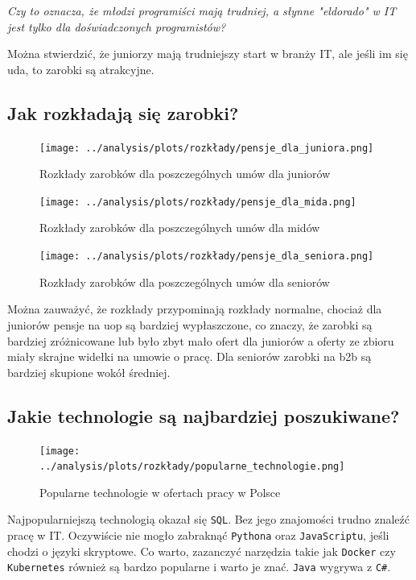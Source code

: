 \documentclass[a4paper]{article}
\begin{document}
\begin{center}
    \textit{Czy to oznacza, że młodzi programiści mają trudniej, a słynne "eldorado" w IT jest tylko dla doświadczonych programistów?}
\end{center}

\quad Można stwierdzić, że juniorzy mają trudniejszy start w branży IT, ale jeśli im się uda, to zarobki są atrakcyjne.


\subsection{Jak rozkładają się zarobki?}

\begin{figure}[H]
    \centering
    \texttt{[image: ../analysis/plots/rozkłady/pensje\_dla\_juniora.png]}
    \caption{Rozkłady zarobków dla poszczególnych umów dla juniorów}
\end{figure}

\begin{figure}[H]
    \centering
    \texttt{[image: ../analysis/plots/rozkłady/pensje\_dla\_mida.png]}
    \caption{Rozkłady zarobków dla poszczególnych umów dla midów}
\end{figure}

\begin{figure}[H]
    \centering
    \texttt{[image: ../analysis/plots/rozkłady/pensje\_dla\_seniora.png]}
    \caption{Rozkłady zarobków dla poszczególnych umów dla seniorów}
\end{figure}

\quad Można zauważyć, że rozkłady przypominają rozkłady normalne, chociaż dla juniorów pensje na uop
są bardziej wypłaszczone, co znaczy, że zarobki są bardziej zróżnicowane lub było zbyt mało ofert dla juniorów a oferty ze zbioru miały skrajne widełki na umowie o pracę. Dla seniorów zarobki na b2b są bardziej skupione wokół średniej.


\subsection{Jakie technologie są najbardziej poszukiwane?}

\begin{figure}[H]
    \centering
    \texttt{[image: ../analysis/plots/rozkłady/popularne\_technologie.png]}
    \caption{Popularne technologie w ofertach pracy w Polsce}
\end{figure}

\quad Najpopularniejszą technologią okazał się \texttt{SQL}. Bez jego znajomości trudno znaleźć pracę w IT. Oczywiście nie mogło zabraknąć \texttt{Pythona} oraz \texttt{JavaScriptu}, jeśli chodzi o języki skryptowe.
Co warto, zazanczyć narzędzia takie jak \texttt{Docker} czy \texttt{Kubernetes} również są bardzo popularne i warto je znać. \texttt{Java} wygrywa z \texttt{C\#}.
\end{document}
